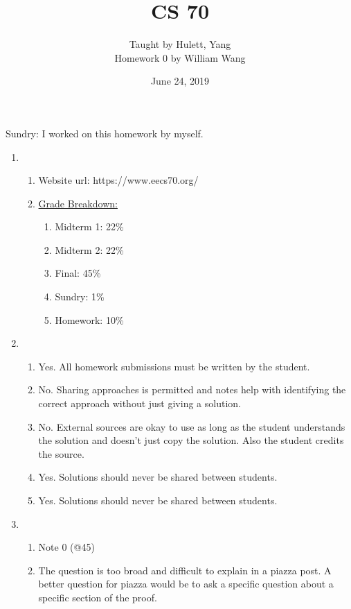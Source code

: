 \documentclass[a4paper]{article}
\title{\textbf{CS 70}}
\author{\large Taught by Hulett, Yang\\
Homework 0 by William Wang}
\date{June 24, 2019}
\newcommand{\<}{\langle}
\renewcommand{\>}{\rangle}
\renewcommand{\^}{\wedge}
\begin{document}
\maketitle

\newpage

Sundry: I worked on this homework by myself.
\begin{enumerate}
    \item 
        \begin{enumerate}
            \item Website url: https://www.eecs70.org/
            \item \underline{Grade Breakdown:}
                \begin{enumerate}
                    \item Midterm 1: 22\%
                    \item Midterm 2: 22\%
                    \item Final: 45\%
                    \item Sundry: 1\%
                    \item Homework: 10\%
                \end{enumerate}
        \end{enumerate}
    \item 
        \begin{enumerate}
            \item Yes. All homework submissions must be written by the student.
            \item No. Sharing approaches is permitted and notes help with identifying the correct approach without just giving a solution.
            \item No. External sources are okay to use as long as the student understands the solution and doesn't just copy the solution. Also the student credits the source.
            \item Yes. Solutions should never be shared between students.
            \item Yes. Solutions should never be shared between students.
        \end{enumerate}
    \item
        \begin{enumerate}
            \item Note 0 (@45)
            \item The question is too broad and difficult to explain in a piazza post. A better question for piazza would be to ask a specific question about a specific section of the proof.

\end{enumerate}
\end{enumerate}
\end{document}

